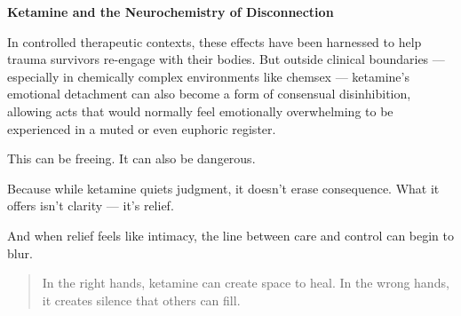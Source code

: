 \begin{TechnicalSidebar}{\textbf{Ketamine and the Neurochemistry of Disconnection}}
  \medskip
  
  In controlled therapeutic contexts, these effects have been harnessed to help trauma survivors re-engage 
  with their bodies. But outside clinical boundaries — especially in chemically complex environments like 
  chemsex — ketamine’s emotional detachment can also become a form of consensual disinhibition, allowing 
  acts that would normally feel emotionally overwhelming to be experienced in a muted or even euphoric 
  register.
  
  \medskip
  
  This can be freeing.
  It can also be dangerous.

  \medskip
  
  Because while ketamine quiets judgment, it doesn’t erase consequence. What it offers isn’t clarity 
  — it’s relief.

  \medskip
  
  And when relief feels like intimacy, the line between care and control can begin to blur.
  
  \begin{quote}
    In the right hands, ketamine can create space to heal.  
    In the wrong hands, it creates silence that others can fill.
  \end{quote}
  
\end{TechnicalSidebar}
